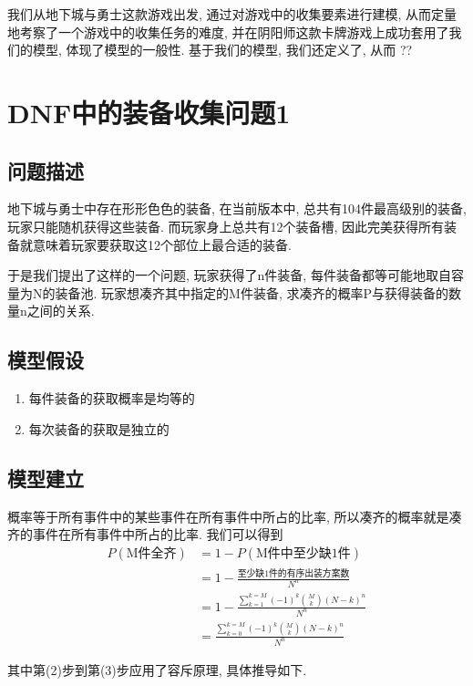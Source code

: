 \documentclass[10pt,journal,compsoc]{IEEEtran}
\begin{document}
  我们从地下城与勇士这款游戏出发, 通过对游戏中的收集要素进行建模, 从而定量地考察了一个游戏中的收集任务的难度, 并在阴阳师这款卡牌游戏上成功套用了我们的模型, 体现了模型的一般性. 基于我们的模型, 我们还定义了, 从而 ??

\section{DNF中的装备收集问题1}

  \subsection{问题描述}
    地下城与勇士中存在形形色色的装备, 在当前版本中, 总共有104件最高级别的装备, 玩家只能随机获得这些装备. 而玩家身上总共有12个装备槽, 因此完美获得所有装备就意味着玩家要获取这12个部位上最合适的装备.

    于是我们提出了这样的一个问题, 玩家获得了n件装备, 每件装备都等可能地取自容量为N的装备池. 玩家想凑齐其中指定的M件装备, 求凑齐的概率P与获得装备的数量n之间的关系.

  \subsection{模型假设}
    \begin{enumerate}
      \item 每件装备的获取概率是均等的
      \item 每次装备的获取是独立的
    \end{enumerate}

  \subsection{模型建立}
    概率等于所有事件中的某些事件在所有事件中所占的比率, 所以凑齐的概率就是凑齐的事件在所有事件中所占的比率. 我们可以得到
    \begin{align}
      P(\text{M件全齐}) &= 1-P(\text{M件中至少缺1件})\\
      &= 1-\frac{\text{至少缺1件的有序出装方案数}}{N^n}\\
      &= 1-\frac{\sum_{k=1}^{k=M}(-1)^k\binom{M}{k}(N-k)^n}{N^n}\\
      &= \frac{\sum_{k=0}^{k=M}(-1)^k\binom{M}{k}(N-k)^n}{N^n}
    \end{align}
    
    其中第(2)步到第(3)步应用了容斥原理, 具体推导如下.
    
\end{document}
